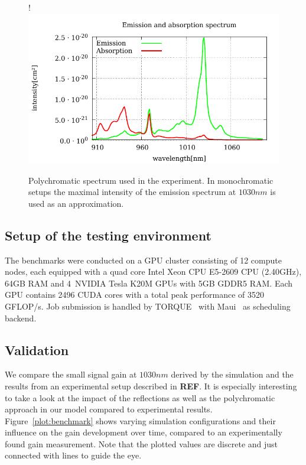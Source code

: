\begin{figure}[H]
  \centerline{
     {!} {\includegraphics{plot/sigma.pdf}}
  }
  \caption{Polychromatic spectrum used in the experiment. In monochromatic setups
  the maximal intensity of the emission spectrum at $1030nm$ is used as an
  approximation.}
\label{plot:polychromatic_spectrum}
\end{figure}

\subsection{Setup of the testing environment}
\label{subsec:testingEnvironment}
The benchmarks were conducted on a GPU cluster consisting of 12 compute nodes,
each equipped with a quad core Intel Xeon CPU E5-2609 CPU (2.40GHz), 64GB RAM
and 4~NVIDIA Tesla K20M GPUs with 5GB GDDR5 RAM\@. Each GPU contains 2496 CUDA cores with a total
peak performance of 3520 GFLOP/s. Job submission is handled by TORQUE~\cite{torque} 
with Maui~\cite{maui} as scheduling backend. 


\subsection{Validation}
\label{subsec:validation}
We compare the small signal gain at $1030 nm$
derived by the simulation and the results from an experimental setup described
in \textbf{REF}. 
It is especially interesting to take a look at the impact of the reflections as well as the polychromatic
approach in our model compared to experimental results. Figure~\ref{plot:benchmark} shows
varying simulation configurations and their influence on the
gain development over time, compared to an experimentally found gain measurement.
Note that the plotted values are discrete and just connected with lines to guide the eye.

